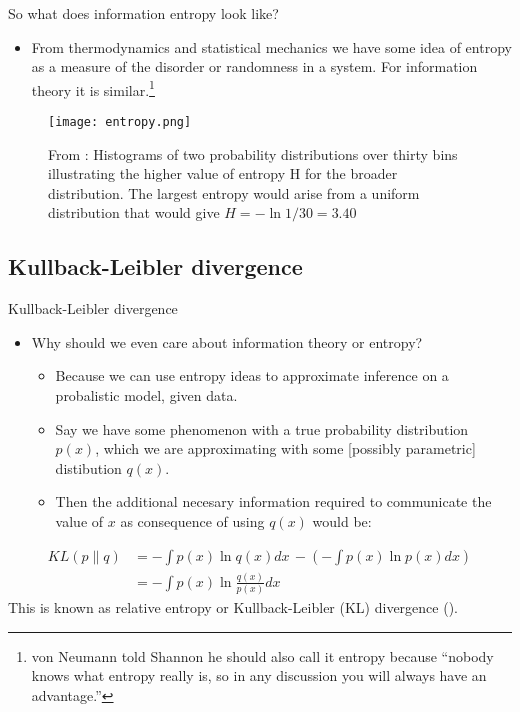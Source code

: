 \documentclass{beamer}
\begin{document}
\begin{frame}{So what does information entropy look like?}
\begin{itemize}
\item From thermodynamics and statistical mechanics we have some idea of entropy as a measure of the disorder or randomness in a system. For information theory it is similar.\footnote{von Neumann told Shannon he should also call it entropy because ``nobody knows what entropy really is, so in any discussion you will always have an advantage.''}
\end{itemize}

\begin{figure}
\texttt{[image: entropy.png]}
\caption{\label{fig:entropy}From \cite{bishop}: Histograms of two probability distributions over thirty bins illustrating the higher value of entropy H for the broader distribution. The largest entropy would arise from a uniform distribution that would give $H = -\ln 1/30 = 3.40$}
\end{figure}

\end{frame}


\subsection{Kullback-Leibler divergence}
\begin{frame}{Kullback-Leibler divergence}
\begin{itemize}
\item Why should we even care about information theory or entropy?
  \begin{itemize}
  \item Because we can use entropy ideas to approximate inference on a probalistic model, given data.
  \item Say we have some phenomenon with a true probability distribution $p(x)$, which we are approximating with some [possibly parametric] distibution $q(x)$.
  \item Then the additional necesary information required to communicate the value of $x$ as consequence of using $q(x)$ would be:
  \end{itemize}
\end{itemize}
\begin{equation}
  \begin{split}
    KL(p\|q) & = - \int p(x) \ln q(x) dx \, - \left(-\int p(x) \ln p(x) dx \right) \\
    & =  - \int p(x) \ln  \frac{q(x)}{p(x)} dx
  \end{split}
\end{equation}
  This is known as relative entropy or  Kullback-Leibler (KL) divergence (\cite{kullback1951}).
\end{frame}
\end{document}
